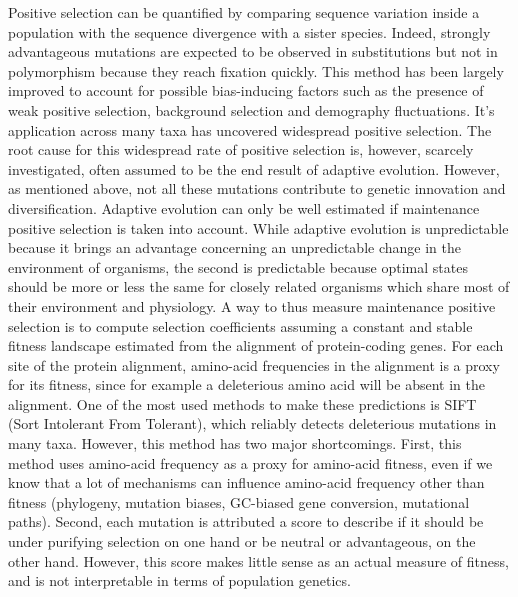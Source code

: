 \documentclass{article}
\begin{document}
    Positive selection can be quantified by comparing sequence variation inside a population with the sequence divergence with a sister species\cite{mcdonald_adaptative_1991}.
    Indeed, strongly advantageous mutations are expected to be observed in substitutions but not in polymorphism because they reach fixation quickly.
    This method has been largely improved to account for possible bias-inducing factors such as the presence of weak positive selection, background selection and demography fluctuations\cite{eyre-walker_distribution_2006, eyre-walker_estimating_2009, galtier_adaptive_2016, tataru_inference_2017}.
    It's application across many taxa has uncovered widespread positive selection\cite{moutinho_variation_2019}.
    The root cause for this widespread rate of positive selection is, however, scarcely investigated, often assumed to be the end result of adaptive evolution.
    However, as mentioned above, not all these mutations contribute to genetic innovation and diversification.
    Adaptive evolution can only be well estimated if maintenance positive selection is taken into account.
    While adaptive evolution is unpredictable because it brings an advantage concerning an unpredictable change in the environment of organisms, the second is predictable because optimal states should be more or less the same for closely related organisms which share most of their environment and physiology.
    A way to thus measure maintenance positive selection is to compute selection coefficients assuming a constant and stable fitness landscape estimated from the alignment of protein-coding genes.
    For each site of the protein alignment, amino-acid frequencies in the alignment is a proxy for its fitness, since for example a deleterious amino acid will be absent in the alignment.
    One of the most used methods to make these predictions is SIFT (Sort Intolerant From Tolerant), which reliably detects deleterious mutations in many taxa\cite{ng_sift_2003, vaser_sift_2016}.
    However, this method has two major shortcomings.
    First, this method uses amino-acid frequency as a proxy for amino-acid fitness, even if we know that a lot of mechanisms can influence amino-acid frequency other than fitness (phylogeny, mutation biases, GC-biased gene conversion, mutational paths).
    Second, each mutation is attributed a score to describe if it should be under purifying selection on one hand or be neutral or advantageous, on the other hand.
    However, this score makes little sense as an actual measure of fitness, and is not interpretable in terms of population genetics.
\end{document}
